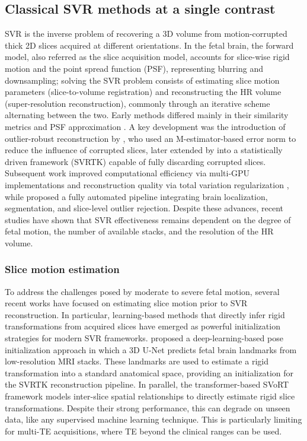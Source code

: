 \documentclass[preprint,authoryear,12pt]{elsarticle}
\begin{document}
\subsection{Classical SVR methods at a single contrast}
\label{sec:SVR}
SVR is the inverse problem of recovering a 3D volume from motion-corrupted thick 2D slices acquired at different orientations. In the fetal brain, the forward model, also referred as the slice acquisition model, accounts for slice-wise rigid motion and the point spread function (PSF), representing blurring and downsampling; solving the SVR problem consists of estimating slice motion parameters (slice-to-volume registration) and reconstructing the HR volume (super-resolution reconstruction), commonly through an iterative scheme alternating between the two. Early methods differed mainly in their similarity metrics and PSF approximation \citep{rousseau_registration-based_2006, jiang_mri_2007}. A key development was the introduction of outlier-robust reconstruction by \citet{gholipour_robust_2010}, who used an M-estimator-based error norm to reduce the influence of corrupted slices, later extended by \citet{kuklisova-murgasova_reconstruction_2012} into a statistically driven framework (SVRTK) capable of fully discarding corrupted slices. Subsequent work improved computational efficiency via multi-GPU implementations \citep{kainz_fast_2015} and reconstruction quality via total variation regularization \citep{tourbier_efficient_2015}, while \citet{ebner_automated_2020} proposed a fully automated pipeline integrating brain localization, segmentation, and slice-level outlier rejection. Despite these advances, recent studies \citep{uus_retrospective_2022, ciceri_geometric_2023, sanchez_biometry_2025, joshi_optimization_2026} have shown that SVR effectiveness remains dependent on the degree of fetal motion, the number of available stacks, and the resolution of the HR volume.

\subsubsection{Slice motion estimation}
To address the challenges posed by moderate to severe fetal motion, several recent works have focused on estimating slice motion prior to SVR reconstruction. In particular, learning-based methods that directly infer rigid transformations from acquired slices have emerged as powerful initialization strategies for modern SVR frameworks. \citet{uus_scanner-based_2025} proposed a deep-learning-based pose initialization approach in which a 3D U-Net predicts fetal brain landmarks from low-resolution MRI stacks. These landmarks are used to estimate a rigid transformation into a standard anatomical space, providing an initialization for the SVRTK reconstruction pipeline. In parallel, the transformer-based SVoRT framework \citep{xu_svort_2022} models inter-slice spatial relationships to directly estimate rigid slice transformations. Despite their strong performance, this can degrade on unseen data, like any supervised machine learning technique. This is particularly limiting for multi-TE acquisitions, where TE beyond the clinical ranges can be used.
\end{document}
